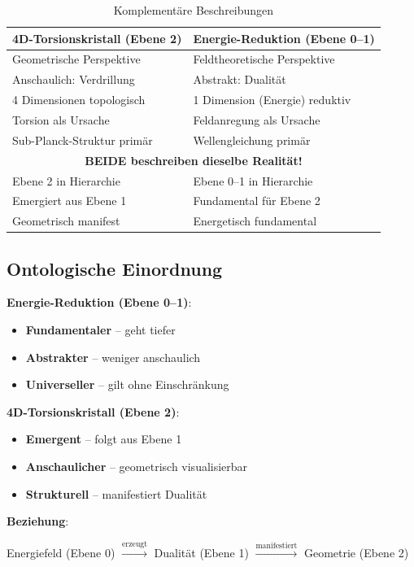 \begin{table}[h]
\centering
\small
\begin{tabular}{p{5cm}|p{5cm}}
\toprule
\textbf{4D-Torsionskristall (Ebene 2)} & \textbf{Energie-Reduktion (Ebene 0--1)} \\
\midrule
Geometrische Perspektive & Feldtheoretische Perspektive \\
Anschaulich: Verdrillung & Abstrakt: Dualität \\
4 Dimensionen topologisch & 1 Dimension (Energie) reduktiv \\
Torsion als Ursache & Feldanregung als Ursache \\
Sub-Planck-Struktur primär & Wellengleichung primär \\
\midrule
\multicolumn{2}{c}{\textbf{BEIDE beschreiben dieselbe Realität!}} \\
\midrule
Ebene 2 in Hierarchie & Ebene 0--1 in Hierarchie \\
Emergiert aus Ebene 1 & Fundamental für Ebene 2 \\
Geometrisch manifest & Energetisch fundamental \\
\bottomrule
\end{tabular}
\caption{Komplementäre Beschreibungen}
\end{table}

\subsection{Ontologische Einordnung}

\begin{keyresult}
\textbf{Energie-Reduktion (Ebene 0--1)}:
\begin{itemize}
\item \textbf{Fundamentaler} -- geht tiefer
\item \textbf{Abstrakter} -- weniger anschaulich
\item \textbf{Universeller} -- gilt ohne Einschränkung
\end{itemize}

\vspace{0.3cm}

\textbf{4D-Torsionskristall (Ebene 2)}:
\begin{itemize}
\item \textbf{Emergent} -- folgt aus Ebene 1
\item \textbf{Anschaulicher} -- geometrisch visualisierbar
\item \textbf{Strukturell} -- manifestiert Dualität
\end{itemize}

\vspace{0.3cm}

\textbf{Beziehung}:
\begin{center}
Energiefeld (Ebene 0) $\xrightarrow{\text{erzeugt}}$ Dualität (Ebene 1) $\xrightarrow{\text{manifestiert}}$ Geometrie (Ebene 2)
\end{center}
\end{keyresult}

